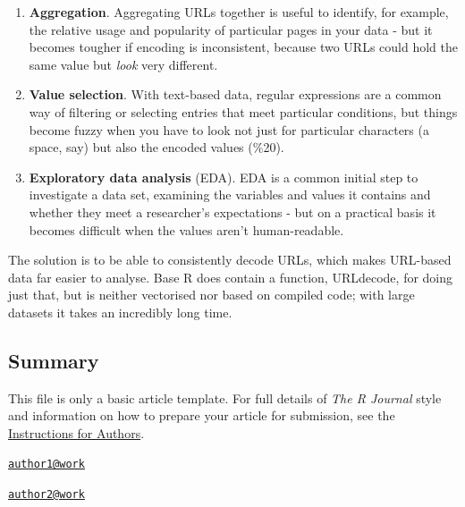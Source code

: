 \begin{enumerate}
\def\labelenumi{\arabic{enumi}.}
\itemsep1pt\parskip0pt
\item
  \textbf{Aggregation}. Aggregating URLs together is useful to identify,
  for example, the relative usage and popularity of particular pages in
  your data - but it becomes tougher if encoding is inconsistent,
  because two URLs could hold the same value but \emph{look} very
  different.
\item
  \textbf{Value selection}. With text-based data, regular expressions
  are a common way of filtering or selecting entries that meet
  particular conditions, but things become fuzzy when you have to look
  not just for particular characters (a space, say) but also the encoded
  values (\%20).
\item
  \textbf{Exploratory data analysis} (EDA). EDA is a common initial step
  to investigate a data set, examining the variables and values it
  contains and whether they meet a researcher's expectations - but on a
  practical basis it becomes difficult when the values aren't
  human-readable.
\end{enumerate}

The solution is to be able to consistently decode URLs, which makes
URL-based data far easier to analyse. Base R does contain a function,
URLdecode, for doing just that, but is neither vectorised nor based on
compiled code; with large datasets it takes an incredibly long time.

\subsection{Summary}\label{summary}

This file is only a basic article template. For full details of
\emph{The R Journal} style and information on how to prepare your
article for submission, see the
\href{http://journal.r-project.org/latex/RJauthorguide.pdf}{Instructions
for Authors}.



\address{
Oliver Keyes\\
Wikimedia Foundation\\
line 1\\ line 2\\
}
\href{mailto:author1@work}{\nolinkurl{author1@work}}

\address{
Bob Rudis\\
Rapid7\\
line 1\\ line 2\\
}
\href{mailto:author2@work}{\nolinkurl{author2@work}}

